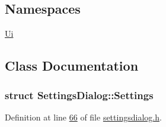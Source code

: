 \subsection*{Namespaces}
\begin{DoxyCompactItemize}
\item 
 \hyperlink{a00145}{Ui}
\end{DoxyCompactItemize}


\subsection{Class Documentation}
\label{dc/d9a/a00218}
\hypertarget{a00075_dc/d9a/a00218}{}
\subsubsection{struct Settings\+Dialog\+:\+:Settings}


Definition at line \hyperlink{a00132_source_l00066}{66} of file \hyperlink{a00132_source}{settingsdialog.\+h}.



